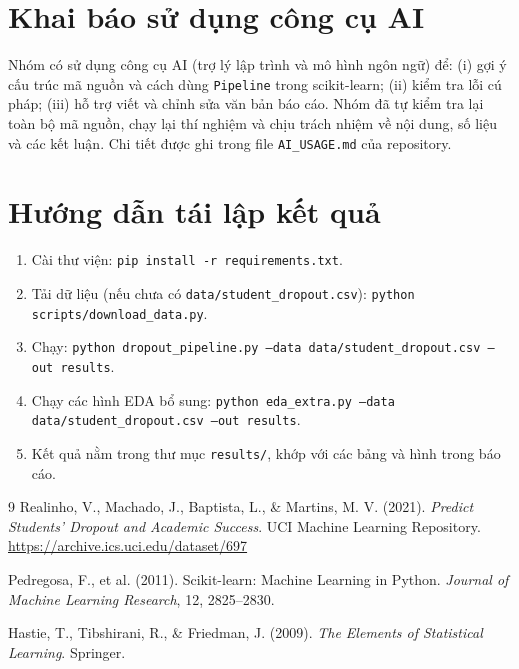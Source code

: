 \documentclass[12pt,a4paper]{article}
\begin{document}
\appendix
\section{Khai báo sử dụng công cụ AI}
Nhóm có sử dụng công cụ AI (trợ lý lập trình và mô hình ngôn ngữ) để: (i) gợi ý cấu trúc mã nguồn và cách dùng \texttt{Pipeline} trong scikit-learn; (ii) kiểm tra lỗi cú pháp; (iii) hỗ trợ viết và chỉnh sửa văn bản báo cáo. Nhóm đã tự kiểm tra lại toàn bộ mã nguồn, chạy lại thí nghiệm và chịu trách nhiệm về nội dung, số liệu và các kết luận. Chi tiết được ghi trong file \texttt{AI\_USAGE.md} của repository.

\section{Hướng dẫn tái lập kết quả}
\begin{enumerate}
  \item Cài thư viện: \texttt{pip install -r requirements.txt}.
  \item Tải dữ liệu (nếu chưa có \texttt{data/student\_dropout.csv}): \texttt{python scripts/download\_data.py}.
  \item Chạy: \texttt{python dropout\_pipeline.py --data data/student\_dropout.csv --out results}.
  \item Chạy các hình EDA bổ sung: \texttt{python eda\_extra.py --data data/student\_dropout.csv --out results}.
  \item Kết quả nằm trong thư mục \texttt{results/}, khớp với các bảng và hình trong báo cáo.
\end{enumerate}

\begin{thebibliography}{9}
Realinho, V., Machado, J., Baptista, L., \& Martins, M. V. (2021).
\textit{Predict Students' Dropout and Academic Success}. UCI Machine Learning Repository.
\url{https://archive.ics.uci.edu/dataset/697}

Pedregosa, F., et al. (2011). Scikit-learn: Machine Learning in Python. \textit{Journal of Machine Learning Research}, 12, 2825--2830.

Hastie, T., Tibshirani, R., \& Friedman, J. (2009). \textit{The Elements of Statistical Learning}. Springer.
\end{thebibliography}
\end{document}
